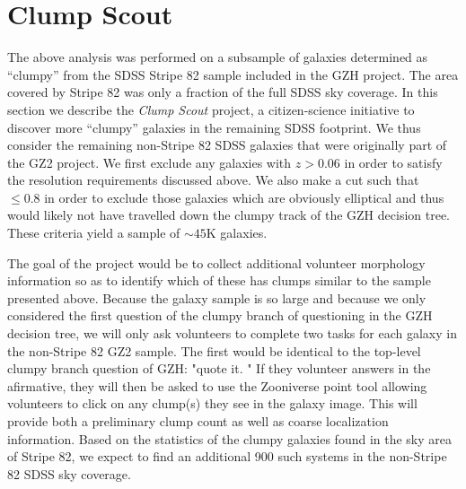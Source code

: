 \section{Clump Scout}
The above analysis was performed on a subsample of galaxies determined as ``clumpy'' from the SDSS Stripe 82 sample included in the GZH project. The area covered by Stripe 82 was only a fraction of the full SDSS sky coverage. In this section we describe the \textit{Clump Scout} project, a citizen-science initiative to discover more ``clumpy'' galaxies in the remaining SDSS footprint. We thus consider the remaining non-Stripe 82 SDSS galaxies that were originally part of the GZ2 project. We first exclude any galaxies with $z>0.06$ in order to satisfy the resolution requirements discussed above. We also make a cut such that \fsmooth~$\le0.8$ in order to exclude those galaxies which are obviously elliptical and thus would likely not have travelled down the clumpy track of the GZH decision tree. These criteria yield a sample of $\sim45$K galaxies. 

The goal of the project would be to collect additional volunteer morphology information so as to identify which of these has clumps similar to the sample presented above. Because the galaxy sample is so large and because we only considered the first question of the clumpy branch of questioning in the GZH decision tree, we will only ask volunteers to complete two tasks for each galaxy in the non-Stripe 82 GZ2 sample. The first would be identical to the top-level clumpy branch question of GZH: "quote it. " If they volunteer answers in the afirmative, they will then be asked to use the Zooniverse point tool allowing volunteers to click on any clump(s) they see in the galaxy image. This will provide both a preliminary clump count as well as coarse localization information. Based on the statistics of the clumpy galaxies found in the sky area of Stripe 82, we expect to find an additional 900 such systems in the non-Stripe 82 SDSS sky coverage.

